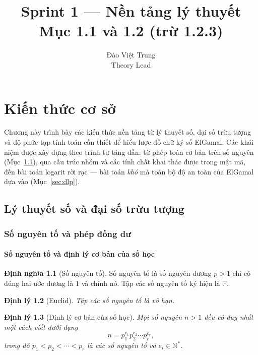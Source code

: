 \documentclass[12pt,a4paper]{report}
\title{Sprint 1 — Nền tảng lý thuyết\\
\large Mục 1.1 và 1.2 (trừ 1.2.3)}
\author{Đào Việt Trung \\ \small Theory Lead}
\date{}
\newtheorem{theorem}{Định lý}[chapter]
\theoremstyle{definition}
\newtheorem{definition}[theorem]{Định nghĩa}
\theoremstyle{remark}
\begin{document}
\maketitle

\chapter{Kiến thức cơ sở}
\label{chap:foundations}

Chương này trình bày các kiến thức nền tảng từ lý thuyết số, đại số trừu tượng và độ phức tạp tính toán cần thiết để hiểu lược đồ chữ ký số ElGamal. Các khái niệm được xây dựng theo trình tự tăng dần: từ phép toán cơ bản trên số nguyên (Mục~\ref{sec:number-theory}), qua cấu trúc nhóm và các tính chất khai thác được trong mật mã, đến bài toán logarit rời rạc — bài toán \emph{khó} mà toàn bộ độ an toàn của ElGamal dựa vào (Mục~\ref{sec:dlp}).

\section{Lý thuyết số và đại số trừu tượng}
\label{sec:number-theory}

\subsection{Số nguyên tố và phép đồng dư}
\label{subsec:primes-modular}

\subsubsection{Số nguyên tố và định lý cơ bản của số học}

\begin{definition}[Số nguyên tố]
Số nguyên tố là số nguyên dương $p > 1$ chỉ có đúng hai ước dương là $1$ và chính nó. Tập các số nguyên tố ký hiệu là $\mathbb{P}$.
\end{definition}

\begin{theorem}[Euclid]
Tập các số nguyên tố là vô hạn.
\end{theorem}

\begin{theorem}[Định lý cơ bản của số học]
Mọi số nguyên $n > 1$ đều có duy nhất một cách viết dưới dạng
\[
n = p_1^{e_1} p_2^{e_2} \cdots p_r^{e_r},
\]
trong đó $p_1 < p_2 < \cdots < p_r$ là các số nguyên tố và $e_i \in \mathbb{N}^*$.
\end{theorem}
\end{document}
